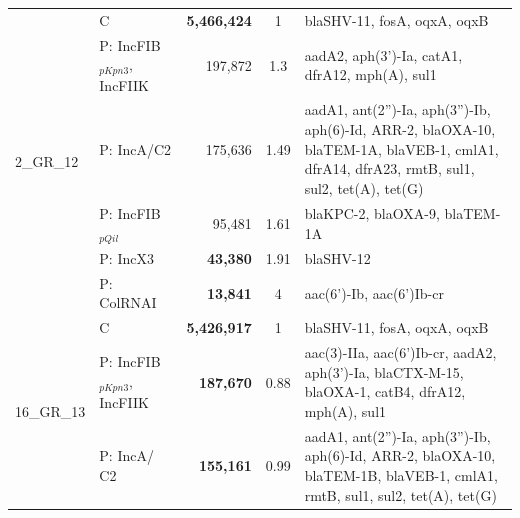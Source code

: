 \begin{landscape}
\begin{table}[!ht]
\begin{tabular}{|l|l|r|c|p{12cm}|}
\multirow{6}{*}{2\_GR\_12}  & C                           & \textbf{5,466,424}     & 1        & blaSHV-11, fosA, oqxA, oqxB                                                                                                                \\ \cline{2-5} 
                            & P: IncFIB$_{pKpn3}$, IncFIIK     & 197,872      & 1.3      & aadA2, aph(3')-Ia, catA1, dfrA12, mph(A), sul1                                                                                             \\ \cline{2-5} 
                            & P: IncA/C2                  & 175,636      & 1.49     & aadA1, ant(2'')-Ia, aph(3'')-Ib, aph(6)-Id, ARR-2, blaOXA-10, blaTEM-1A, blaVEB-1, cmlA1, dfrA14, dfrA23, rmtB, sul1, sul2, tet(A), tet(G) \\ \cline{2-5} 
                            & P: IncFIB$_{pQil}$               & 95,481       & 1.61     & blaKPC-2, blaOXA-9, blaTEM-1A                                                                                                              \\ \cline{2-5} 
                            & P: IncX3                    & \textbf{43,380}       & 1.91     & blaSHV-12                                                                                                                                  \\ \cline{2-5} 
                            & P: ColRNAI                  & \textbf{13,841}       & 4        & aac(6')-Ib, aac(6')Ib-cr                                                                                                                   \\ \hline \hline
\multirow{6}{*}{16\_GR\_13} & C                           & \textbf{5,426,917}     & 1        & blaSHV-11, fosA, oqxA, oqxB                                                                                                                \\ \cline{2-5} 
                            & P: IncFIB$_{pKpn3}$, IncFIIK     & \textbf{187,670}      & 0.88     & aac(3)-IIa, aac(6')Ib-cr, aadA2, aph(3')-Ia, blaCTX-M-15, blaOXA-1, catB4, dfrA12, mph(A), sul1                                            \\ \cline{2-5} 
                            & P: IncA/ C2                 & \textbf{155,161}      & 0.99     & aadA1, ant(2'')-Ia, aph(3'')-Ib, aph(6)-Id, ARR-2, blaOXA-10, blaTEM-1B, blaVEB-1, cmlA1, rmtB, sul1, sul2, tet(A), tet(G)                 \\ \cline{2-5} 

\end{tabular}
\end{table}
\end{landscape}
